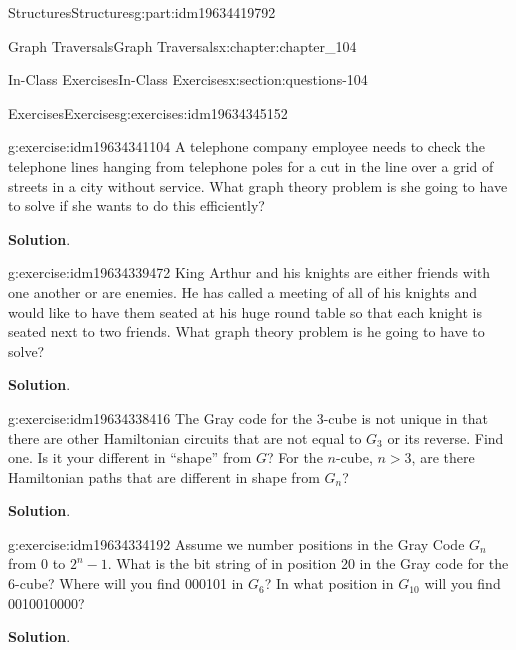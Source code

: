 \documentclass[oneside,10pt,]{book}
\newcommand{\blocktitlefont}{\relax}
\numberwithin{equation}{section}
\newcommand{\gt}{>}
\begin{document}
\begin{partptx}{Structures}{}{Structures}{}{}{g:part:idm19634419792}
\begin{chapterptx}{Graph Traversals}{}{Graph Traversals}{}{}{x:chapter:chapter_104}
\begin{sectionptx}{In-Class Exercises}{}{In-Class Exercises}{}{}{x:section:questions-104}
\begin{exercises-subsection-numberless}{Exercises}{}{Exercises}{}{}{g:exercises:idm19634345152}
\begin{exercisegroup}
\begin{divisionexerciseeg}{2}{}{}{g:exercise:idm19634341104}
A telephone company employee needs to check the telephone lines hanging from telephone poles for a cut in the line over a grid of streets in a city without service.  What graph theory problem is she going to have to solve if she wants to do this efficiently?%
\par\smallskip%
\noindent\textbf{\blocktitlefont Solution}.\hypertarget{g:solution:idm19634339728}{}\quad{}%
\end{divisionexerciseeg}%
\begin{divisionexerciseeg}{3}{}{}{g:exercise:idm19634339472}%
King Arthur and his knights are either friends with one another or are enemies.  He has called a meeting of all of his knights and would like to have them seated at his huge round table so that each knight is seated next to two friends. What graph theory problem is he going to have to solve?%
\par\smallskip%
\noindent\textbf{\blocktitlefont Solution}.\hypertarget{g:solution:idm19634338672}{}\quad{}%
\end{divisionexerciseeg}%
\begin{divisionexerciseeg}{4}{}{}{g:exercise:idm19634338416}%
The Gray code for the 3-cube is not unique in that there are other Hamiltonian circuits that are not equal to \(G_3\) or its reverse.  Find one.   Is it your different in ``shape'' from \(G\)?   For the \(n\)-cube, \(n \gt 3\), are there Hamiltonian paths that are different in shape from \(G_n\)?%
\par\smallskip%
\noindent\textbf{\blocktitlefont Solution}.\hypertarget{g:solution:idm19634336928}{}\quad{}%
\end{divisionexerciseeg}%
\begin{divisionexerciseeg}{5}{}{}{g:exercise:idm19634334192}%
Assume we number positions in the Gray Code \(G_n\) from 0 to \(2^n-1\).  What is the bit string of in position 20 in the Gray code for the 6-cube? Where will you find 000101 in \(G_6\)?	 In what position in \(G_{10}\) will you find 0010010000?%
\par\smallskip%
\noindent\textbf{\blocktitlefont Solution}.\hypertarget{g:solution:idm19634334064}{}\quad{}%
\end{divisionexerciseeg}%
\end{exercisegroup}
\par\medskip\noindent
\end{exercises-subsection-numberless}
\end{sectionptx}
\end{chapterptx}
%
\typeout{************************************************}

\end{partptx}
\end{document}
